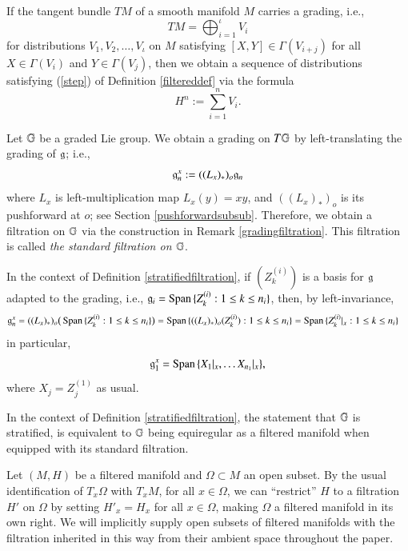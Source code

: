 \documentclass[leqno]{amsart}
\begin{document}
	\begin{remark}\label{gradingfiltration}
		If the tangent bundle $TM$ of a smooth manifold $M$ carries a grading, i.e.,
		$$TM=\bigoplus_{i=1}^\iota V_i$$
		for distributions $V_1, V_2, \hdots, V_\iota$ on $M$ satisfying $[X, Y]\in \Gamma(V_{i+j})$ for all $X\in\Gamma(V_i)$ and $Y\in\Gamma(V_j)$, then we obtain a sequence of distributions satisfying (\ref{step}) of Definition \ref{filtereddef} via the formula $$H^n:=\sum_{i=1}^n V_i.$$
	\end{remark}
	\begin{definition}\label{stratifiedfiltration}
		Let $\GG$ be a graded Lie group. We obtain a grading on $T\GG$ by left-translating the grading of $\g$; i.e.,
		$$\gra{n}{x}:=((L_x)_*)_o\g_n$$
		where $L_x$ is left-multiplication map $L_x(y)=xy$, and $((L_x)_*)_o$ is its pushforward at $o$; see Section \ref{pushforwardsubsub}. Therefore, we obtain a filtration on $\GG$ via the construction in Remark \ref{gradingfiltration}. This filtration is called \textit{the standard filtration on $\GG$}. 
	\end{definition}
	\begin{remark}\label{spanner}
		In the context of Definition \ref{stratifiedfiltration}, if $(Z^{(i)}_k)$ is a basis for $\g$ adapted to the grading, i.e., $\g_i=\Span\{Z^{(i)}_k : 1\leq k\leq n_i\}$, then, by left-invariance,
		\begin{align*}
			\gra{n}{x} &= ((L_x)_*)_o\big(\Span\{Z^{(i)}_k : 1\leq k\leq n_i\}\big) = \Span\{((L_x)_*)_o(Z^{(i)}_k) : 1\leq k\leq n_i\}=\Span\{Z^{(i)}_k|_x : 1\leq k\leq n_i\}
		\end{align*}
		in particular,
		$$\gra 1 x = \Span\{X_1|_x,\hdots X_{n_1}|_x\},$$
		where $X_j=Z^{(1)}_j$ as usual.
	\end{remark}
	\begin{remark}
		In the context of Definition \ref{stratifiedfiltration}, the statement that $\GG$ is stratified, is equivalent to $\GG$ being equiregular as a filtered manifold when equipped with its standard filtration.
	\end{remark}
	
	\begin{remark}
		Let $(M, H)$ be a filtered manifold and $\Omega\subset M$ an open subset. By the usual identification of $T_x\Omega$ with $T_xM$, for all $x\in \Omega$, we can ``restrict'' $H$ to a filtration $H'$ on $\Omega$ by setting $H'_x=H_x$ for all $x\in\Omega$, making $\Omega$ a filtered manifold in its own right. We will implicitly supply open subsets of filtered manifolds with the filtration inherited in this way from their ambient space throughout the paper.
	\end{remark}
	
\end{document}
